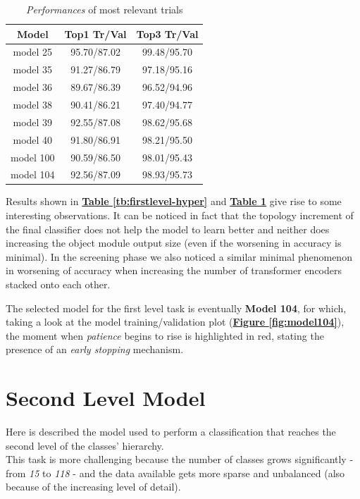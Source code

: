 \documentclass[12pt]{article}
\begin{document}
\begin{table}[ht!]
	    \centering
	    \scriptsize
	    \begin{tabular}{ |c|c|c| }
        \hline
        \textbf{Model} & \textbf{Top1 Tr/Val} & \textbf{Top3 Tr/Val}\\
        \hline
        model 25 & 95.70/87.02 & 99.48/95.70 \\
        model 35 & 91.27/86.79 & 97.18/95.16 \\
        model 36 & 89.67/86.39 & 96.52/94.96 \\
        model 38 & 90.41/86.21 & 97.40/94.77 \\
        model 39 & 92.55/87.08 & 98.62/95.68 \\
        model 40 & 91.80/86.91 & 98.21/95.50 \\
        model 100 & 90.59/86.50 & 98.01/95.43 \\
        model 104 & 92.56/87.09 & 98.93/95.73 \\
        \hline
        \end{tabular}
        \captionsetup{justification   = centering}
	    \caption{\textit{Performances} of most relevant trials}
	    \label{tb:firstlevel-results}
\end{table}
\pagebreak

Results shown in \hyperref[tb:firstlevel-hyper]{\textbf{Table \ref{tb:firstlevel-hyper}}} and \hyperref[tb:firstlevel-results]{\textbf{Table \ref{tb:firstlevel-results}}} give rise to some interesting observations. It can be noticed in fact that the topology increment of the final classifier does not help the model to learn better and neither does increasing the object module output size (even if the worsening in accuracy is minimal). In the screening phase we also noticed a similar minimal phenomenon in worsening of accuracy when increasing the number of transformer encoders stacked onto each other. 

The selected model for the first level task is eventually \textbf{Model 104}, for which, taking a look at the model training/validation plot (\hyperref[fig:model104]{\textbf{Figure \ref{fig:model104}}}), the moment when \textit{patience} begins to rise is highlighted in red, stating the presence of an \textit{early stopping} mechanism.


\section{Second Level Model}\label{sec:2lev-model}
Here is described the model used to perform a classification that reaches the second level of the classes' hierarchy.\\
This task is more challenging because the number of classes grows significantly - from \textit{15} to \textit{118} - and the data available gets more sparse and unbalanced (also because of the increasing level of detail).
\end{document}
